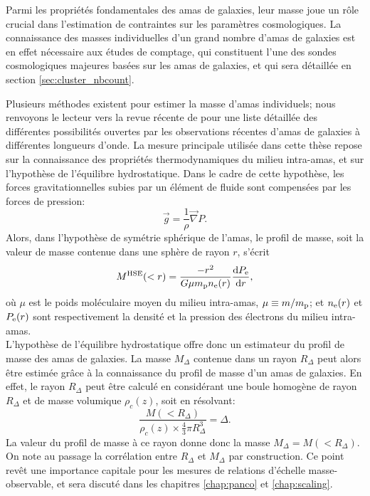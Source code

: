 Parmi les propriétés fondamentales des amas de galaxies, leur masse joue un rôle crucial dans l'estimation de contraintes sur les paramètres cosmologiques.
La connaissance des masses individuelles d'un grand nombre d'amas de galaxies est en effet nécessaire aux études de comptage, qui constituent l'une des sondes cosmologiques majeures basées sur les amas de galaxies, et qui sera détaillée en section \ref{sec:cluster_nbcount}.

Plusieurs méthodes existent pour estimer la masse d'amas individuels; nous renvoyons le lecteur vers la revue récente de  pour une liste détaillée des différentes possibilités ouvertes par les observations récentes d'amas de galaxies à différentes longueurs d'onde.
La mesure principale utilisée dans cette thèse repose sur la connaissance des propriétés thermodynamiques du milieu intra-amas, et sur l'hypothèse de l'équilibre hydrostatique.
Dans le cadre de cette hypothèse, les forces gravitationnelles subies par un élément de fluide sont compensées par les forces de pression:
\begin{equation}
    \vec{g} = \frac{1}{\rho} \vec{\nabla} P.
\end{equation}
Alors, dans l'hypothèse de symétrie sphérique de l'amas, le profil de masse, soit la valeur de masse contenue dans une sphère de rayon $r$, s'écrit
\begin{equation}
    \label{eq:mhse}
    M^{\rm HSE}(<r) = \frac{-r^2}{G \mu m_{\rm p} n_{\rm e}(r)} \frac{\mathrm{d} P_{\rm e}}{\mathrm{d} r},
\end{equation}
où $\mu$ est le poids moléculaire moyen du milieu intra-amas, $\mu \equiv m/m_{\rm p}$; et $n_{\rm e}(r)$ et $P_{\rm e}(r)$ sont respectivement la densité et la pression des électrons du milieu intra-amas. \\
L'hypothèse de l'équilibre hydrostatique offre donc un estimateur du profil de masse des amas de galaxies.
La masse $M_\Delta$ contenue dans un rayon $R_\Delta$ peut alors être estimée grâce à la connaissance du profil de masse d'un amas de galaxies.
En effet, le rayon $R_\Delta$ peut être calculé en considérant une boule homogène de rayon $R_\Delta$ et de masse volumique $\rho_c(z)$, soit en résolvant:
\begin{equation}
    \label{eq:r_delta_from_m}
    \frac{M(<R_\Delta)}{\rho_c(z) \times \frac{4}{3} \pi R_\Delta^3} = \Delta.
\end{equation}
La valeur du profil de masse à ce rayon donne donc la masse $M_\Delta = M(<R_\Delta)$.
On note au passage la corrélation entre $R_\Delta$ et $M_\Delta$ par construction. Ce point revêt une importance capitale pour les mesures de relations d'échelle masse-observable, et sera discuté dans les chapitres \ref{chap:panco} et \ref{chap:scaling}.

